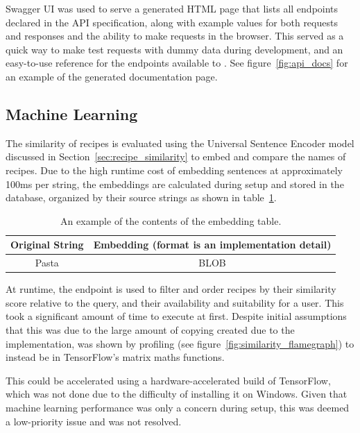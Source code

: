 Swagger UI was used to serve a generated HTML page that lists all endpoints declared in
the API specification, along with example values for both requests and responses and the ability to make requests in
the browser. This served as a quick way to make test requests with dummy data during development, and an easy-to-use
reference for the endpoints available to . See figure~\ref{fig:api_docs} for an example of the
generated documentation page.

\subsection{Machine Learning}
The similarity of recipes is evaluated using the Universal Sentence Encoder model discussed in Section~\ref{sec:recipe_similarity} to
embed and compare the names of recipes. Due to the high runtime cost of embedding sentences at approximately 100ms per string,
the embeddings are calculated during setup and stored in the database, organized by their source strings as shown in table~\ref{fig:embedding_table}.

\begin{table}[h]
    \centering
    \caption{\label{fig:embedding_table}An example of the contents of the embedding table.}
    \begin{tabular}{cc}
        \toprule
        \textbf{Original String} & \textbf{Embedding (format is an implementation detail)} \\\midrule
        Pasta & BLOB \\\bottomrule
    \end{tabular}
\end{table}

At runtime, the  endpoint is used to filter and order recipes by their similarity score
relative to the query, and their availability and suitability for a user.
This took a significant amount of time to execute at first. Despite initial assumptions that this was due to the large amount of copying
created due to the implementation, was shown by profiling (see figure~\ref{fig:similarity_flamegraph}) to instead be in TensorFlow's
matrix maths functions.

This could be accelerated using a hardware-accelerated build of TensorFlow, which was not done due to the difficulty of installing
it on Windows. Given that machine learning performance was only a concern during setup, this was deemed a low-priority
issue and was not resolved.

